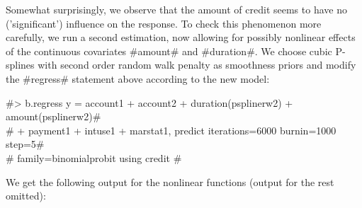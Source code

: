 \normalsize

Somewhat surprisingly, we observe that the amount of credit seems
to have no ('significant') influence on the response. To check
this phenomenon more carefully, we run a second estimation, now
allowing for possibly nonlinear effects of the continuous
covariates #amount# and #duration#. We choose cubic P-splines with
second order random walk penalty as smoothness priors and modify
the #regress# statement above according to the new model:

#> b.regress  y = account1 + account2 + duration(psplinerw2) + amount(psplinerw2)# \\
#  + payment1 + intuse1 + marstat1, predict iterations=6000 burnin=1000 step=5# \\
#  family=binomialprobit using credit #

We get the following output for the nonlinear functions (output
for the rest omitted):

\small

